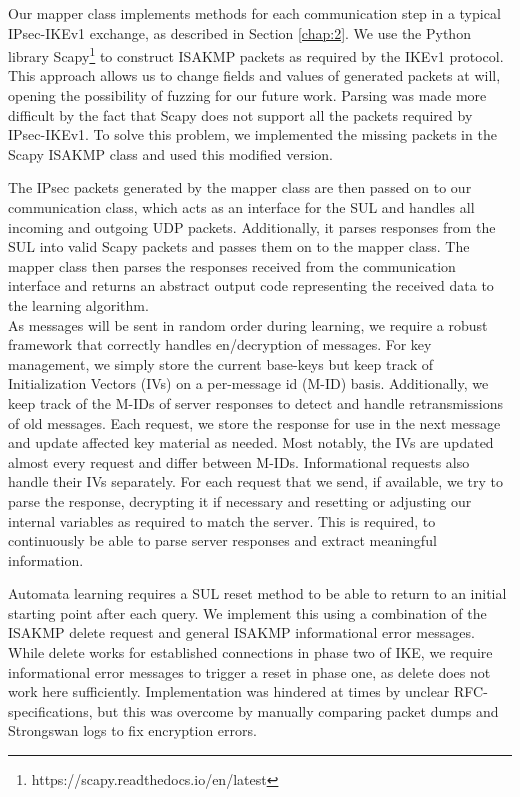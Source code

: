 \documentclass[runningheads]{llncs}
\begin{document}
Our mapper class implements methods for each communication step in a typical IPsec-IKEv1 exchange, as described in Section \ref{chap:2}. We use the Python library Scapy\footnote{https://scapy.readthedocs.io/en/latest} to construct ISAKMP packets as required by the IKEv1 protocol. This approach allows us to change fields and values of generated packets at will, opening the possibility of fuzzing for our future work. Parsing was made more difficult by the fact that Scapy does not support all the packets required by IPsec-IKEv1. To solve this problem, we implemented the missing packets in the Scapy ISAKMP class and used this modified version. 

The IPsec packets generated by the mapper class are then passed on to our communication class, which acts as an interface for the SUL and handles all incoming and outgoing UDP packets. Additionally, it parses responses from the SUL into valid Scapy packets and passes them on to the mapper class. The mapper class then parses the responses received from the communication interface and returns an abstract output code representing the received data to the learning algorithm. \\

As messages will be sent in random order during learning, we require a robust framework that correctly handles en/decryption of messages. For key management, we simply store the current base-keys but keep track of Initialization Vectors (IVs) on a per-message id (M-ID) basis. Additionally, we keep track of the M-IDs of server responses to detect and handle retransmissions of old messages. Each request, we store the response for use in the next message and update affected key material as needed. Most notably, the IVs are updated almost every request and differ between M-IDs. Informational requests also handle their IVs separately. For each request that we send, if available, we try to parse the response, decrypting it if necessary and resetting or adjusting our internal variables as required to match the server. This is required, to continuously be able to parse server responses and extract meaningful information.

Automata learning requires a SUL reset method to be able to return to an initial starting point after each query. We implement this using a combination of the ISAKMP delete request and general ISAKMP informational error messages. While delete works for established connections in phase two of IKE, we require informational error messages to trigger a reset in phase one, as delete does not work here sufficiently. Implementation was hindered at times by unclear RFC-specifications, but this was overcome by manually comparing packet dumps and Strongswan logs to fix encryption errors.\\
\end{document}
